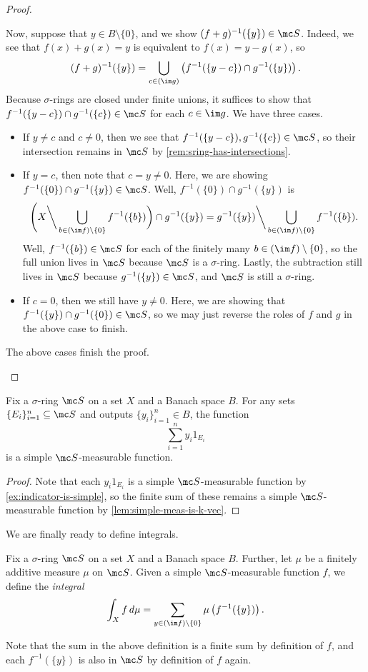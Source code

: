 \documentclass[../notes.tex]{subfiles}
\begin{document}
\begin{proof}
\begin{itemize}
		Now, suppose that $y\in B\setminus\{0\}$, and we show $(f+g)^{-1}(\{y\})\in\mc S$. Indeed, we see that $f(x)+g(x)=y$ is equivalent to $f(x)=y-g(x)$, so
		\[(f+g)^{-1}(\{y\})=\bigcup_{c\in(\im g)}\left(f^{-1}(\{y-c\})\cap g^{-1}(\{y\})\right).\]
		Because $\sigma$-rings are closed under finite unions, it suffices to show that $f^{-1}(\{y-c\})\cap g^{-1}(\{c\})\in\mc S$ for each $c\in\im g$. We have three cases.
		\begin{itemize}
			\item If $y\ne c$ and $c\ne0$, then we see that $f^{-1}(\{y-c\}),g^{-1}(\{c\})\in\mc S$, so their intersection remains in $\mc S$ by \autoref{rem:sring-has-intersections}.
			\item If $y=c$, then note that $c=y\ne0$. Here, we are showing $f^{-1}(\{0\})\cap g^{-1}(\{y\})\in\mc S$. Well, $f^{-1}(\{0\})\cap g^{-1}(\{y\})$ is
			\[\Bigg(X{\mathbin\bigg\backslash}\bigcup_{b\in(\im f)\setminus\{0\}}f^{-1}(\{b\})\bigg)\cap g^{-1}(\{y\})=g^{-1}(\{y\}){\mathbin\bigg\backslash}\bigcup_{b\in(\im f)\setminus\{0\}}f^{-1}(\{b\}).\]
			Well, $f^{-1}(\{b\})\in\mc S$ for each of the finitely many $b\in(\im f)\setminus\{0\}$, so the full union lives in $\mc S$ because $\mc S$ is a $\sigma$-ring. Lastly, the subtraction still lives in $\mc S$ because $g^{-1}(\{y\})\in\mc S$, and $\mc S$ is still a $\sigma$-ring.
			\item If $c=0$, then we still have $y\ne0$. Here, we are showing that $f^{-1}(\{y\})\cap g^{-1}(\{0\})\in\mc S$, so we may just reverse the roles of $f$ and $g$ in the above case to finish.
		\end{itemize}
		The above cases finish the proof.
		\qedhere
	\end{itemize}
\end{proof}
\begin{corollary}
	Fix a $\sigma$-ring $\mc S$ on a set $X$ and a Banach space $B$. For any sets $\{E_i\}_{i=1}^n\subseteq\mc S$ and outputs $\{y_i\}_{i=1}^n\in B$, the function
	\[\sum_{i=1}^ny_i1_{E_i}\]
	is a simple $\mc S$-measurable function.
\end{corollary}
\begin{proof}
	Note that each $y_i1_{E_i}$ is a simple $\mc S$-measurable function by \autoref{ex:indicator-is-simple}, so the finite sum of these remains a simple $\mc S$-measurable function by \autoref{lem:simple-meas-is-k-vec}.
\end{proof}
We are finally ready to define integrals.
\begin{definition}[Integral]
	Fix a $\sigma$-ring $\mc S$ on a set $X$ and a Banach space $B$. Further, let $\mu$ be a finitely additive measure $\mu$ on $\mc S$. Given a simple $\mc S$-measurable function $f$, we define the \textit{integral}
	\[\int_Xf\,d\mu=\sum_{y\in(\im f)\setminus\{0\}}\mu\left(f^{-1}(\{y\})\right).\]
\end{definition}
Note that the sum in the above definition is a finite sum by definition of $f$, and each $f^{-1}(\{y\})$ is also in $\mc S$ by definition of $f$ again.
\end{document}
